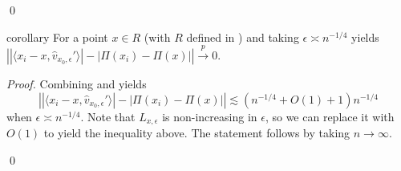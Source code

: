 \documentclass[11pt]{article}
\begin{document}
\qed{}

\begin{restatable}{corollary}{} \label{corollary: projection error limit}
    For a point $x\in R$ (with $R$ defined in ) and taking $\epsilon \asymp n^{-1/4}$ yields $\left||\langle x_i - x, \hat{v}_{x_0, \epsilon}'\rangle| - |\Pi(x_i) - \Pi(x)| \right| \overset{p}{\rightarrow} 0$. 
\end{restatable}
\noindent \textit{Proof.} Combining  and  yields
\[\left||\langle x_i - x, \hat{v}_{x_0, \epsilon}'\rangle| - |\Pi(x_i) - \Pi(x)|\right| \lesssim (n^{-1/4} + O(1) + 1)n^{-1/4}\]
when $\epsilon \asymp n^{-1/4}$. Note that $L_{x, \epsilon}$ is non-increasing in $\epsilon$, so we can replace it with $O(1)$ to yield the inequality above. The statement follows by taking $n \rightarrow \infty$. 

\qed{}
\end{document}

